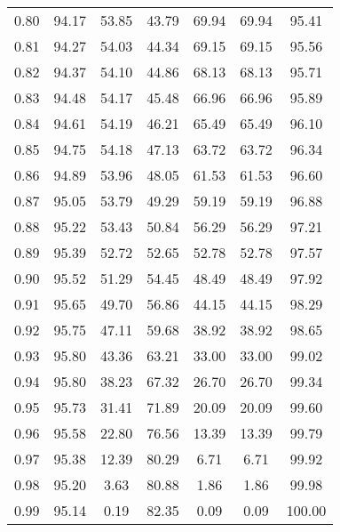 \begin{tabular}{|c|c|c|c|c|c|c|}
      0.80 &     94.17 &     53.85 &      43.79 &   69.94 &      69.94 &         95.41 \\
      0.81 &     94.27 &     54.03 &      44.34 &   69.15 &      69.15 &         95.56 \\
      0.82 &     94.37 &     54.10 &      44.86 &   68.13 &      68.13 &         95.71 \\
      0.83 &     94.48 &     54.17 &      45.48 &   66.96 &      66.96 &         95.89 \\
      0.84 &     94.61 &     54.19 &      46.21 &   65.49 &      65.49 &         96.10 \\
      0.85 &     94.75 &     54.18 &      47.13 &   63.72 &      63.72 &         96.34 \\
      0.86 &     94.89 &     53.96 &      48.05 &   61.53 &      61.53 &         96.60 \\
      0.87 &     95.05 &     53.79 &      49.29 &   59.19 &      59.19 &         96.88 \\
      0.88 &     95.22 &     53.43 &      50.84 &   56.29 &      56.29 &         97.21 \\
      0.89 &     95.39 &     52.72 &      52.65 &   52.78 &      52.78 &         97.57 \\
      0.90 &     95.52 &     51.29 &      54.45 &   48.49 &      48.49 &         97.92 \\
      0.91 &     95.65 &     49.70 &      56.86 &   44.15 &      44.15 &         98.29 \\
      0.92 &     95.75 &     47.11 &      59.68 &   38.92 &      38.92 &         98.65 \\
      0.93 &     95.80 &     43.36 &      63.21 &   33.00 &      33.00 &         99.02 \\
      0.94 &     95.80 &     38.23 &      67.32 &   26.70 &      26.70 &         99.34 \\
      0.95 &     95.73 &     31.41 &      71.89 &   20.09 &      20.09 &         99.60 \\
      0.96 &     95.58 &     22.80 &      76.56 &   13.39 &      13.39 &         99.79 \\
      0.97 &     95.38 &     12.39 &      80.29 &    6.71 &       6.71 &         99.92 \\
      0.98 &     95.20 &      3.63 &      80.88 &    1.86 &       1.86 &         99.98 \\
      0.99 &     95.14 &      0.19 &      82.35 &    0.09 &       0.09 &        100.00 \\
\bottomrule
\end{tabular}
